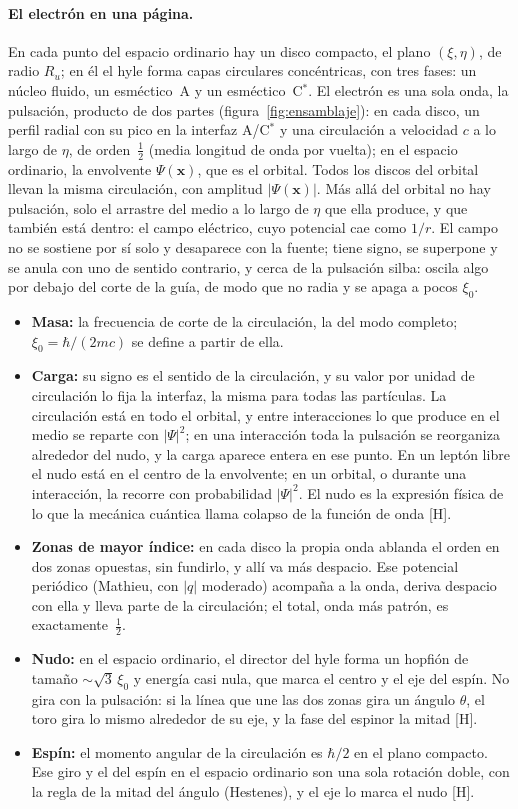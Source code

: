 \documentclass[11pt,a4paper]{article}
\newcommand{\st}[1]{\textup{[#1]}}
\newcommand{\Cst}{C\ensuremath{^{*}}}
\newcommand{\vb}[1]{\symbf{#1}}
\newcommand{\apartado}[1]{\paragraph{#1}}
\begin{document}
\apartado{El electrón en una página.} En cada punto del espacio ordinario hay un disco compacto, el plano $(\xi,\eta)$, de radio $R_u$; en él el hyle forma capas circulares concéntricas, con tres fases: un núcleo fluido, un esméctico~A y un esméctico~\Cst. El electrón es una sola onda, la pulsación, producto de dos partes (figura~\ref{fig:ensamblaje}): en cada disco, un perfil radial con su pico en la interfaz A/\Cst{} y una circulación a velocidad $c$ a lo largo de $\eta$, de orden~$\tfrac12$ (media longitud de onda por vuelta); en el espacio ordinario, la envolvente $\Psi(\vb{x})$, que es el orbital. Todos los discos del orbital llevan la misma circulación, con amplitud $|\Psi(\vb{x})|$. Más allá del orbital no hay pulsación, solo el arrastre del medio a lo largo de $\eta$ que ella produce, y que también está dentro: el campo eléctrico, cuyo potencial cae como $1/r$. El campo no se sostiene por sí solo y desaparece con la fuente; tiene signo, se superpone y se anula con uno de sentido contrario, y cerca de la pulsación silba: oscila algo por debajo del corte de la guía, de modo que no radia y se apaga a pocos $\xi_0$.
\begin{itemize}[leftmargin=*,itemsep=0.1em]
\item \textbf{Masa:} la frecuencia de corte de la circulación, la del modo completo; $\xi_0=\hbar/(2mc)$ se define a partir de ella.
\item \textbf{Carga:} su signo es el sentido de la circulación, y su valor por unidad de circulación lo fija la interfaz, la misma para todas las partículas. La circulación está en todo el orbital, y entre interacciones lo que produce en el medio se reparte con $|\Psi|^2$; en una interacción toda la pulsación se reorganiza alrededor del nudo, y la carga aparece entera en ese punto. En un leptón libre el nudo está en el centro de la envolvente; en un orbital, o durante una interacción, la recorre con probabilidad $|\Psi|^2$. El nudo es la expresión física de lo que la mecánica cuántica llama colapso de la función de onda \st{H}.
\item \textbf{Zonas de mayor índice:} en cada disco la propia onda ablanda el orden en dos zonas opuestas, sin fundirlo, y allí va más despacio. Ese potencial periódico (Mathieu, con $|q|$ moderado) acompaña a la onda, deriva despacio con ella y lleva parte de la circulación; el total, onda más patrón, es exactamente~$\tfrac12$.
\item \textbf{Nudo:} en el espacio ordinario, el director del hyle forma un hopfión de tamaño $\sim\sqrt3\,\xi_0$ y energía casi nula, que marca el centro y el eje del espín. No gira con la pulsación: si la línea que une las dos zonas gira un ángulo $\theta$, el toro gira lo mismo alrededor de su eje, y la fase del espinor la mitad \st{H}.
\item \textbf{Espín:} el momento angular de la circulación es $\hbar/2$ en el plano compacto. Ese giro y el del espín en el espacio ordinario son una sola rotación doble, con la regla de la mitad del ángulo (Hestenes), y el eje lo marca el nudo \st{H}.
\end{itemize}
\end{document}
